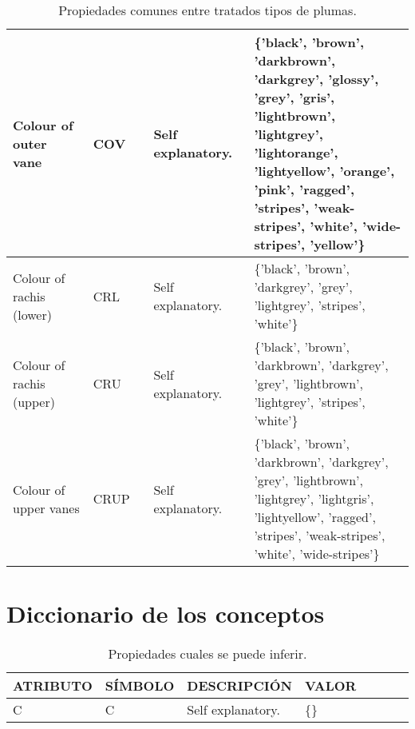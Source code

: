 \documentclass[a4paper,12pt]{article}
\begin{document}
\begin{table}[H]
\begin{tabular}{|p{0.2\linewidth}|p{0.15\linewidth}|p{0.25\linewidth}|p{0.45\linewidth}|}
		Colour of outer vane     & COV     & Self explanatory.                             & \{'black', 'brown', 'darkbrown', 'darkgrey', 'glossy', 'grey', 'gris', 'lightbrown', 'lightgrey', 'lightorange', 'lightyellow', 'orange', 'pink', 'ragged', 'stripes', 'weak-stripes', 'white', 'wide-stripes', 'yellow'\} \\ \hline
		Colour of rachis (lower) & CRL     & Self explanatory.                             & \{'black', 'brown', 'darkgrey', 'grey', 'lightgrey', 'stripes', 'white'\}                                                                                     \\ \hline
		Colour of rachis (upper) & CRU     & Self explanatory.                             & \{'black', 'brown', 'darkbrown', 'darkgrey', 'grey', 'lightbrown', 'lightgrey', 'stripes', 'white'\}                                                                         \\ \hline
		Colour of upper vanes    & CRUP    & Self explanatory.                             & \{'black', 'brown', 'darkbrown', 'darkgrey', 'grey', 'lightbrown', 'lightgrey', 'lightgris', 'lightyellow', 'ragged', 'stripes', 'weak-stripes', 'white', 'wide-stripes'\}                                                    \\ \hline
	\end{tabular}
	\caption{Propiedades comunes entre tratados tipos de plumas.}
\end{table}

\section{Diccionario de los conceptos}
\begin{table}[H]
	\centering
	\begin{tabular}{|p{0.2\linewidth}|p{0.15\linewidth}|p{0.25\linewidth}|p{0.4\linewidth}|}
		\hline
		ATRIBUTO & SÍMBOLO & DESCRIPCIÓN       & VALOR \\ \hline\hline
		C        & C       & Self explanatory. & \{\}  \\ \hline
	\end{tabular}
\caption{Propiedades cuales se puede inferir.}
\end{table}
\end{document}
